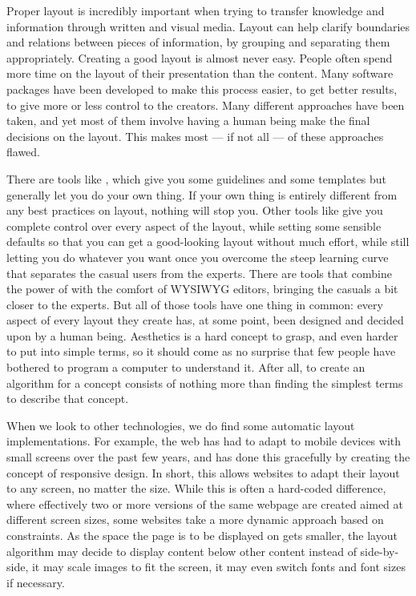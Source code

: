    Proper layout is incredibly important when trying to transfer knowledge and
   information through written and visual media. Layout can help clarify
   boundaries and relations between pieces of information, by grouping and
   separating them appropriately. Creating a good layout is almost never easy.
   People often spend more time on the layout of their presentation than the
   content. Many software packages have been developed to make this process
   easier, to get better results, to give more or less control to the creators.
   Many different approaches have been taken, and yet most of them involve
   having a human being make the final decisions on the layout. This makes most
   --- if not all --- of these approaches flawed. 

   There are tools like \ppt, which give you some guidelines and some templates
   but generally let you do your own thing. If your own thing is entirely
   different from any best practices on layout, nothing will stop you. Other
   tools like \latex give you complete control over every aspect of the layout,
   while setting some sensible defaults so that you can get a good-looking
   layout without much effort, while still letting you do whatever you want
   once you overcome the steep learning curve that separates the casual users
   from the experts. There are tools that combine the power of \latex with the
   comfort of WYSIWYG editors, bringing the casuals a bit closer to the
   experts. But all of those tools have one thing in common: every aspect of
   every layout they create has, at some point, been designed and decided upon
   by a human being. Aesthetics is a hard concept to grasp, and even harder to
   put into simple terms, so it should come as no surprise that few people have
   bothered to program a computer to understand it. After all, to create an
   algorithm for a concept consists of nothing more than finding the simplest
   terms to describe that concept.

   When we look to other technologies, we do find some automatic layout
   implementations. For example, the web has had to adapt to mobile devices
   with small screens over the past few years, and has done this gracefully by
   creating the concept of responsive design. In short, this allows websites to
   adapt their layout to any screen, no matter the size. While this is often a
   hard-coded difference, where effectively two or more versions of the same
   webpage are created aimed at different screen sizes, some websites take a
   more dynamic approach based on constraints. As the space the page is to be
   displayed on gets smaller, the layout algorithm may decide to display
   content below other content instead of side-by-side, it may scale images to
   fit the screen, it may even switch fonts and font sizes if necessary.

